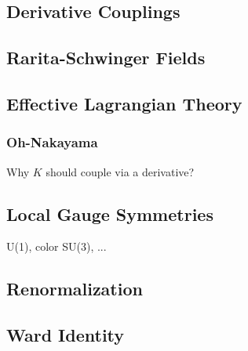 \documentclass{jarticle}
\newcommand{\myqftsrcdirectory}[0]{./}
\begin{document}
\subsection{Derivative Couplings}


\newpage
\subsection{Rarita-Schwinger Fields}

\subsection{Effective Lagrangian Theory}
\subsubsection{Oh-Nakayama}
Why $K$ should couple via a derivative?
\subsection{Local Gauge Symmetries}
U(1), color SU(3), ...\\

\subsection{Renormalization}
\subsection{Ward Identity}


\begin{comment}
\newpage
\setcounter{section}{10}
\section{interference terms}
\section{$\gamma p \rightarrow \phi X$}
\section{Sasha PRC72}
\section{$\gamma p \rightarrow K \Lambda$}
\end{comment}
\end{document}
